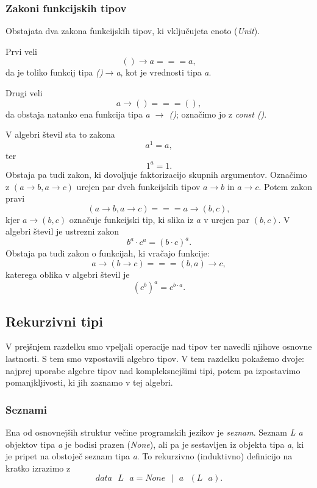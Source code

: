 \documentclass[a4paper, 12pt]{book}
\begin{document}
\subsubsection{Zakoni funkcijskih tipov}

Obstajata dva zakona funkcijskih tipov, ki vključujeta enoto (\emph{Unit}). 

\noindent Prvi veli
$$()\to a===a,$$
da je toliko funkcij tipa \emph{()$\to$a}, kot je vrednosti tipa \emph{a}.

\noindent Drugi veli
$$a\to ()=== (),$$
da obstaja natanko ena funkcija tipa \emph{a $\to$ ()}; označimo jo z \emph{const ()}. 

\noindent V algebri števil sta to zakona
$$a^1=a,$$
ter
$$1^a=1.$$
Obstaja pa tudi zakon, ki dovoljuje faktorizacijo skupnih argumentov. Označimo z $(a\to b, a\to c)$ urejen par dveh funkcijskih tipov $a\to b$ in $a\to c$. Potem zakon pravi
$$(a\to b, a\to c)===a\to(b,c),$$
kjer $a\to(b,c)$ označuje funkcijski tip, ki slika iz $a$ v urejen par $(b,c)$. V algebri števil je ustrezni zakon
$$b^a\cdot c^a=(b\cdot c)^a.$$
Obstaja pa tudi zakon o funkcijah, ki vračajo funkcije:
$$a\to (b\to c)===(b,a)\to c,$$
katerega oblika v algebri števil je
$$(c^b)^a=c^{b\cdot a}.$$

\subsection{Rekurzivni tipi}

V prejšnjem razdelku smo vpeljali operacije nad tipov ter navedli njihove osnovne lastnosti. S tem smo vzpostavili algebro tipov. V tem razdelku pokažemo dvoje: najprej uporabe algebre tipov nad kompleksnejšimi tipi, potem pa izpostavimo pomanjkljivosti, ki jih zaznamo v tej algebri.

\subsubsection{Seznami}

Ena od osnovnejših struktur večine programskih jezikov je \emph{seznam}. Seznam \emph{L a} objektov tipa \emph{a} je bodisi prazen (\emph{None}), ali pa je sestavljen iz objekta tipa \emph{a}, ki je pripet na obstoječ seznam tipa \emph{a}. To rekurzivno (induktivno) definicijo na kratko izrazimo z
\begin{equation}
data\text{ }L\text{ }a=None\text{ }\vert\text{ } a\text{ }(L\text{ }a). \label{eq:listHaskell}
\end{equation}
\end{document}
